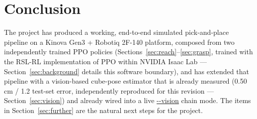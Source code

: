 \documentclass[11pt]{article}
\begin{document}
\section{Conclusion}
\label{sec:conclusion}

The project has produced a working, end-to-end simulated pick-and-place pipeline
on a Kinova Gen3 + Robotiq 2F-140 platform, composed from two independently
trained PPO policies (Sections~\ref{sec:reach}--\ref{sec:grasp}, trained with the
RSL-RL implementation of PPO within NVIDIA Isaac Lab --- Section~\ref{sec:background}
details this software boundary), and has extended that pipeline with a vision-based cube-pose
estimator that is already measured (0.50\,cm / 1.2\textdegree{} test-set error, independently
reproduced for this revision --- Section~\ref{sec:vision}) and
already wired into a live \url{--vision} chain mode. The items in Section~\ref{sec:further}
are the natural next steps for the project.
\end{document}
